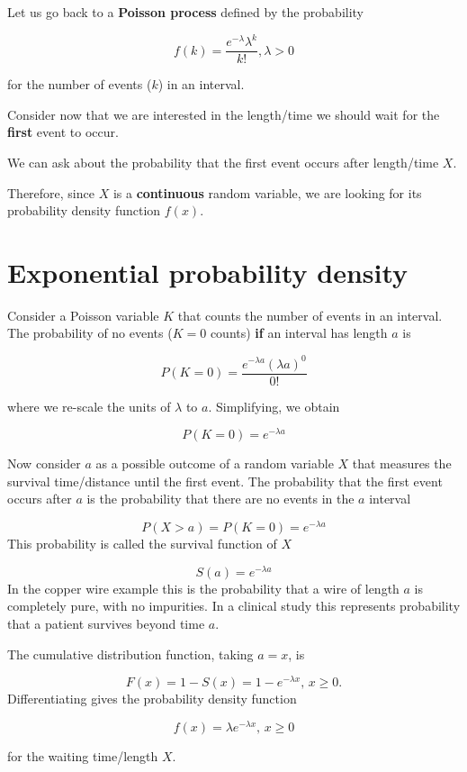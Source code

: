 \documentclass[
]{book}
\begin{document}
Let us go back to a \textbf{Poisson process} defined by the probability

\[f(k)=\frac{e^{-\lambda}\lambda^k}{k!}, \lambda>0\]

for the number of events (\(k\)) in an interval.

Consider now that we are interested in the length/time we should wait for the \textbf{first} event to occur.

We can ask about the probability that the first event occurs after length/time \(X\).

Therefore, since \(X\) is a \textbf{continuous} random variable, we are looking for its probability density function \(f(x)\).

\hypertarget{exponential-probability-density}{%
\section{Exponential probability density}\label{exponential-probability-density}}

Consider a Poisson variable \(K\) that counts the number of events in an interval. The probability of no events (\(K=0\) counts) \textbf{if} an interval has length \(a\) is

\[P(K=0)=\frac{e^{-\lambda a}(\lambda a)^0}{0!}\]

where we re-scale the units of \(\lambda\) to \(a\). Simplifying, we obtain

\[P(K=0)=e^{-\lambda a}\]

Now consider \(a\) as a possible outcome of a random variable \(X\) that measures the survival time/distance until the first event. The probability that the first event occurs after \(a\) is the probability that there are no events in the \(a\) interval

\[P(X>a)=P(K=0)=e^{-\lambda a}\]
This probability is called the survival function of \(X\)

\[S(a)=e^{-\lambda a}\]
In the copper wire example this is the probability that a wire of length \(a\) is completely pure, with no impurities. In a clinical study this represents probability that a patient survives beyond time \(a\).

The cumulative distribution function, taking \(a=x\), is

\[F(x)=1-S(x)= 1- e^{-\lambda x},\, x\geq0.\]
Differentiating gives the probability density function

\[f(x)=\lambda e^{-\lambda x},\, x\geq0\]

for the waiting time/length \(X\).
\end{document}
